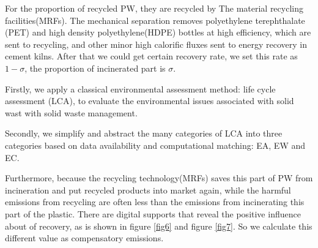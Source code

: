 \documentclass{mcmthesis}
\begin{document}
For the proportion of recycled PW, they are recycled by The material recycling facilities(MRFs). The mechanical separation removes polyethylene terephthalate (PET) and high density polyethylene(HDPE) bottles at high efficiency, which are sent to recycling, and other minor high calorific fluxes sent to energy recovery in cement kilns\cite{Rigamonti}. After that we could get certain recovery rate, we set this rate as $1 - \sigma$, the proportion of incinerated part is $\sigma$.

Firstly, we apply a classical environmental assessment method: life cycle assessment (LCA), to evaluate the environmental issues associated with solid wast with solid waste management\cite{Kirkeby}.

Secondly, we simplify and abstract the many categories of LCA into three categories based on data availability and computational matching: EA, EW and EC.

Furthermore, because the recycling technology(MRFs) saves this part of PW from incineration and put recycled products into market again, while the harmful emissions from recycling are often less than the emissions from incinerating this part of the plastic\cite{Shonfield}. There are digital supports that reveal the positive influence about of recovery, as is shown in figure \ref{fig6} and figure \ref{fig7}. So we calculate this different value as compensatory emissions.
\end{document}
